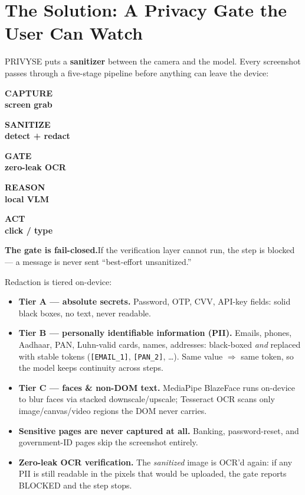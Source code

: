 \documentclass[11pt,a4paper]{article}
\newcommand{\stage}[3]{%
  \noindent\begin{minipage}[t]{0.17\textwidth}
    \centering\footnotesize\bfseries\color{#1}#2\\[2pt]
    {\color{dim}\scriptsize #3}
  \end{minipage}\hfill
}
\begin{document}
\section{The Solution: A Privacy Gate the User Can Watch}

PRIVYSE puts a \textbf{sanitizer} between the camera and the model. Every
screenshot passes through a five-stage pipeline before anything can leave
the device:

\vspace{7pt}
\stage{panel}{CAPTURE}{screen grab}
\stage{violet}{SANITIZE}{detect + redact}
\stage{teal}{GATE}{zero-leak OCR}
\stage{panel}{REASON}{local VLM}
\stage{violet}{ACT}{click / type}
\vspace{7pt}

\begin{promisebox}
\textbf{The gate is fail-closed.}\quad If the verification layer cannot run,
the step is blocked --- a message is never sent ``best-effort unsanitized.''
\end{promisebox}

Redaction is tiered on-device:

\begin{itemize}
  \item \textbf{Tier A --- absolute secrets.} Password, OTP, CVV, API-key
        fields: solid black boxes, no text, never readable.
  \item \textbf{Tier B --- personally identifiable information (PII).}
        Emails, phones, Aadhaar, PAN, Luhn-valid cards, names, addresses:
        black-boxed \emph{and} replaced with stable tokens
        (\texttt{[EMAIL\_1]}, \texttt{[PAN\_2]}, \dots). Same value $\Rightarrow$
        same token, so the model keeps continuity across steps.
  \item \textbf{Tier C --- faces \& non-DOM text.} MediaPipe BlazeFace runs
        on-device to blur faces via stacked downscale/upscale; Tesseract OCR
        scans only image/canvas/video regions the DOM never carries.
  \item \textbf{Sensitive pages are never captured at all.} Banking,
        password-reset, and government-ID pages skip the screenshot entirely.
  \item \textbf{Zero-leak OCR verification.} The \emph{sanitized} image is
        OCR'd again: if any PII is still readable in the pixels that would be
        uploaded, the gate reports \textsc{BLOCKED} and the step stops.
\end{itemize}
\end{document}
